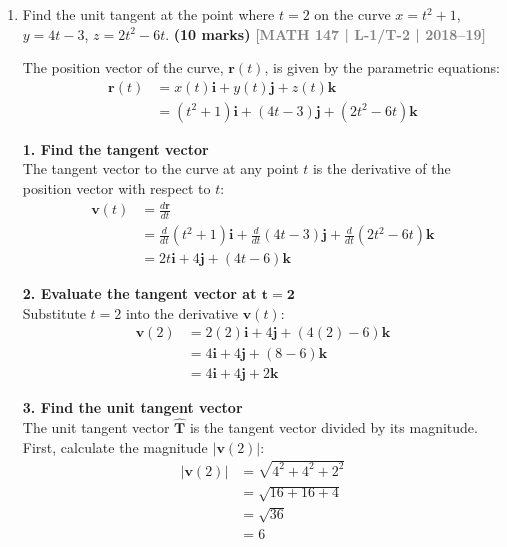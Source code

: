 \documentclass[12pt,a4paper]{article}
\newcommand{\yr}[1]{\hfill\textcolor{gray}{\small\textbf{[#1]}}}
\newcommand{\mk}[1]{\textcolor{orange!70!black}{\small\textbf{(#1 marks)}}}
\begin{document}
\begin{enumerate}
\begin{tcolorbox}[enhanced,breakable,ansbox,colback=cD!4,colframe=cD,boxrule=0.8pt,arc=5pt,title={\textbf{Answer}},fonttitle=\bfseries\color{white},colbacktitle=cD]
\end{tcolorbox}


\item Find the unit tangent at the point where $t=2$ on the curve $x=t^{2}+1$, $y=4t-3$, $z=2t^{2}-6t$.
\mk{10} \yr{MATH 147 | L-1/T-2 | 2018--19}

\begin{tcolorbox}[enhanced,breakable,ansbox,colback=cD!4,colframe=cD,boxrule=0.8pt,arc=5pt,title={\textbf{Answer}},fonttitle=\bfseries\color{white},colbacktitle=cD]

The position vector of the curve, $\mathbf{r}(t)$, is given by the parametric equations:
\begin{align*}
    \mathbf{r}(t) &= x(t)\mathbf{i} + y(t)\mathbf{j} + z(t)\mathbf{k} \\
    &= (t^2 + 1)\mathbf{i} + (4t - 3)\mathbf{j} + (2t^2 - 6t)\mathbf{k}
\end{align*}

\textbf{1. Find the tangent vector} \\
The tangent vector to the curve at any point $t$ is the derivative of the position vector with respect to $t$:
\begin{align*}
    \mathbf{v}(t) &= \frac{d\mathbf{r}}{dt} \\
    &= \frac{d}{dt}(t^2 + 1)\mathbf{i} + \frac{d}{dt}(4t - 3)\mathbf{j} + \frac{d}{dt}(2t^2 - 6t)\mathbf{k} \\
    &= 2t\mathbf{i} + 4\mathbf{j} + (4t - 6)\mathbf{k}
\end{align*}

\vspace{1em}
\textbf{2. Evaluate the tangent vector at $\boldsymbol{t=2}$} \\
Substitute $t = 2$ into the derivative $\mathbf{v}(t)$:
\begin{align*}
    \mathbf{v}(2) &= 2(2)\mathbf{i} + 4\mathbf{j} + (4(2) - 6)\mathbf{k} \\
    &= 4\mathbf{i} + 4\mathbf{j} + (8 - 6)\mathbf{k} \\
    &= 4\mathbf{i} + 4\mathbf{j} + 2\mathbf{k}
\end{align*}

\vspace{1em}
\textbf{3. Find the unit tangent vector} \\
The unit tangent vector $\hat{\mathbf{T}}$ is the tangent vector divided by its magnitude. First, calculate the magnitude $|\mathbf{v}(2)|$:
\begin{align*}
    |\mathbf{v}(2)| &= \sqrt{4^2 + 4^2 + 2^2} \\
    &= \sqrt{16 + 16 + 4} \\
    &= \sqrt{36} \\
    &= 6
\end{align*}


\end{tcolorbox}
\end{enumerate}
\end{document}
